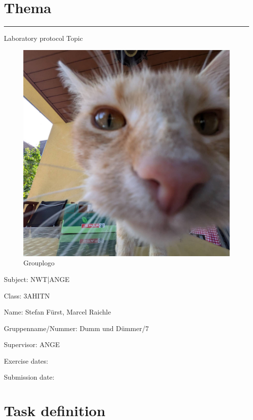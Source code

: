 \documentclass[a4paper]{article}
\begin{document}

\pagestyle{oida}
\section*{Thema}
\par\noindent\rule{\textwidth}{0.4pt}

Laboratory protocol
Topic

\begin{figure}[h]
	\includegraphics[scale=0.3]{images/mika.jpeg}
	\caption{Grouplogo}
\end{figure}

\vspace*{\fill}
Subject:	NWT|ANGE

Class:	3AHITN

Name:	Stefan Fürst, Marcel Raichle

Gruppenname/Nummer: Dumm und Dümmer/7

Supervisor: 	ANGE

Exercise dates:	

Submission date:


\newpage
\tableofcontents

\newpage

\section{Task definition}
\end{document}
